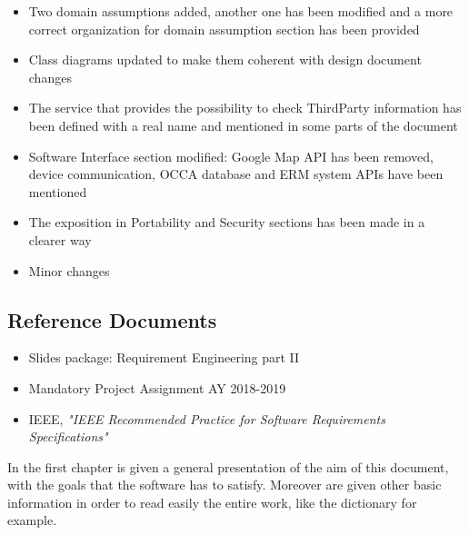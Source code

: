 \begin{flushleft}
\begin{itemize}
\begin{itemize}
	\item Two domain assumptions added, another one has been modified and  a more correct organization for domain assumption section has been provided
	\item Class diagrams updated to make them coherent with design document changes
	\item The service that provides the possibility to check ThirdParty information has been defined with a real name and mentioned in some parts of the document
	\item Software Interface section modified: Google Map API has been removed, device communication, OCCA database and ERM system APIs have been mentioned
	\item The exposition in Portability and Security sections has been made in a clearer way
	\item  Minor changes
\end{itemize}  
\end{itemize}

{\color{Blue}\subsection{Reference Documents}}
\begin{itemize}
\item Slides package: Requirement Engineering part II
\item Mandatory Project Assignment AY 2018-2019
\item IEEE, \textit{"IEEE Recommended Practice for Software Requirements Specifications"}
\end{itemize}
 
{}
{}
In the first chapter is given a general presentation of the aim of this document, with the goals that the software has to satisfy. Moreover are given other basic information in order to read easily the entire work, like the dictionary for example.
\paragraph{}


\end{flushleft}
